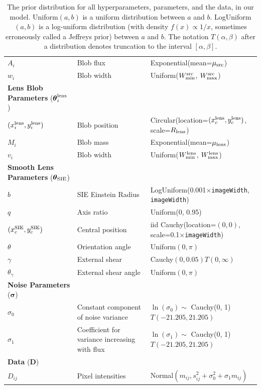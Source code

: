 \documentclass[useAMS,usenatbib]{mn2e}
\begin{document}
\begin{table}
\begin{tabular}{|l|l|l|}
$A_i$  & Blob flux & Exponential(mean=$\mu_{\rm src}$)\\
$w_i$  & Blob width & Uniform($W_{\rm min}^{\rm src}$, $W_{\rm max}^{\rm src}$)\\
\hline
{\bf Lens Blob Parameters} ($\boldsymbol{\theta}_i^{\rm lens}$)\\
\hline
$(x_i^{\rm lens}, y_i^{\rm lens})$ & Blob position & Circular(location=$(x_c^{\rm lens}, y_c^{\rm lens})$, scale=$R_{\rm lens}$) \\
$M_i$  & Blob mass & Exponential(mean=$\mu_{\rm lens}$)\\
$v_i$  & Blob width & Uniform($W_{\rm min}^{\rm lens}$, $W_{\rm max}^{\rm lens}$)\\
\hline
{\bf Smooth Lens Parameters} ($\boldsymbol{\theta}_{\rm SIE}$)\\
\hline
$b$ & SIE Einstein Radius & LogUniform(0.001$\times${\tt imageWidth}, {\tt imageWidth})\\
$q$ & Axis ratio & Uniform(0, 0.95)\\
$(x_c^{\rm SIE}, y_c^{\rm SIE})$ & Central position & iid Cauchy(location=$(0,0)$, scale=0.1$\times${\tt imageWidth})\\
$\theta$ & Orientation angle & Uniform$(0, \pi)$\\
$\gamma$ & External shear & Cauchy$(0, 0.05)T(0, \infty)$\\
$\theta_\gamma$ & External shear angle & Uniform$(0, \pi)$\\
\hline
{\bf Noise Parameters} ($\boldsymbol{\sigma}$)\\
\hline
$\sigma_0$ & Constant component of noise variance & $\ln(\sigma_0) \sim$ Cauchy(0, 1)$T(-21.205, 21.205)$\\
$\sigma_1$ & Coefficient for variance increasing with flux &
$\ln(\sigma_1) \sim$ Cauchy(0, 1)$T(-21.205, 21.205)$\\
\hline
{\bf Data} ($\boldsymbol{D}$)\\
\hline
$D_{ij}$ & Pixel intensities & Normal$(m_{ij}, s_{ij}^2 + \sigma_0^2 + \sigma_1m_{ij})$
\end{tabular}
\caption{The prior distribution for all hyperparameters, parameters, and the
data, in our model. Uniform$(a, b)$ is a uniform
distribution between $a$ and $b$. LogUniform$(a, b)$ is a log-uniform
distribution (with density $f(x) \propto 1/x$, sometimes erroneously called
a Jeffreys prior) between $a$ and $b$. The notation $T(\alpha, \beta)$ after
a distribution denotes truncation to the interval $[\alpha, \beta]$.
\label{tab:priors}}
\end{table}
\end{document}
